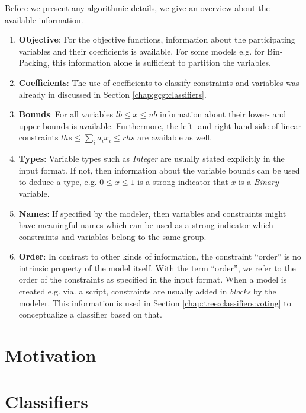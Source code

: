 	Before we present any algorithmic details, we give an overview about the available information.
	
	\begin{enumerate}
		\item \textbf{Objective}: For the objective functions, information about the participating variables and their coefficients is available. For some models e.g. for Bin-Packing, this information alone is sufficient to partition the variables.
		\item \textbf{Coefficients}:
		The use of coefficients to classify constraints and variables was already in discussed in Section \ref{chap:gcg:classifiers}.
		\item \textbf{Bounds}: For all variables $lb \leq x \leq ub$ information about their lower- and upper-bounds is available.
		Furthermore, the left- and right-hand-side of linear constraints $lhs \leq \sum_i a_i x_i \leq rhs$ are available as well.
		\item \textbf{Types}: Variable types such as \textit{Integer} are usually stated explicitly in the input format. If not, then information about the variable bounds can be used to deduce a type, e.g. $0 \leq x \leq 1$ is a strong indicator that $x$ is a \textit{Binary} variable.
		\item \textbf{Names}: If specified by the modeler, then variables and constraints might have meaningful names which can be used as a strong indicator which constraints and variables belong to the same group.
		\item \textbf{Order}: In contrast to other kinds of information, the constraint \enquote{order} is no intrinsic property of the model itself. With the term \enquote{order}, we refer to the order of the constraints as specified in the input format. When a model is created e.g. via. a script, constraints are usually added in \textit{blocks} by the modeler. This information is used in Section \ref{chap:tree:classifiers:voting} to conceptualize a classifier based on that.
	\end{enumerate}
	
	\section{Motivation}
	
		\clearpage
	
	\section{Classifiers}
	
